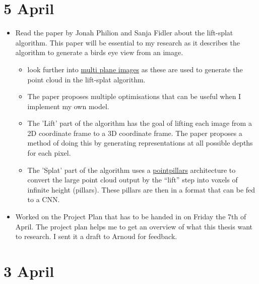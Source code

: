 \documentclass[twoside]{report}
\begin{document}
\section*{5 April}
\begin{itemize}
    \item Read the paper by Jonah Philion and Sanja Fidler about the lift-splat algorithm. This paper will be essential to my research as it describes the algorithm to generate a birds eye view from an image.
    \begin{itemize}
        \item look further into \href{https://single-view-mpi.github.io}{multi plane images} as these are used to generate the point cloud in the lift-splat algorithm.
        \item The paper proposes multiple optimisations that can be useful when I implement my own model.
        \item The 'Lift' part of the algorithm has the goal of lifting each image from a 2D coordinate frame to a 3D coordinate frame. The paper proposes a method of doing this by generating representations at all possible depths for each pixel.
        \item The 'Splat' part of the algorithm uses a \href{https://arxiv.org/abs/1812.05784}{pointpillars} architecture to convert the large point cloud output by the “lift” step into voxels of infinite height (pillars). These pillars are then in a format that can be fed to a CNN.
    \end{itemize}
    \item Worked on the Project Plan that has to be handed in on Friday the 7th of April. The project plan helps me to get an overview of what this thesis want to research. I sent it a draft to Arnoud for feedback.
\end{itemize}


\section*{3 April}
\end{document}
